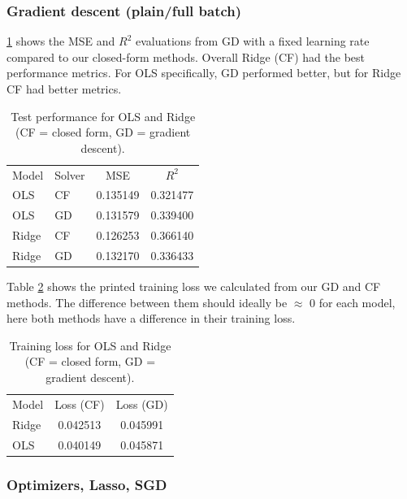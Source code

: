 \documentclass[amssymb,twocolumn,aps]{revtex4-2}
\begin{document}
\subsubsection{Gradient descent (plain/full batch)}

\ref{tab:test-ols-ridge} shows the MSE and $R^2$ evaluations from GD with a fixed learning rate compared to our closed-form methods. Overall Ridge (CF) had the best performance metrics. For OLS specifically, GD performed better, but for Ridge CF had better metrics. 

\begin{table}[h!]  %
\caption{Test performance for OLS and Ridge (CF = closed form, GD = gradient descent).}
\label{tab:test-ols-ridge}
\begin{ruledtabular}
\begin{tabular}{llcc} %
Model & Solver & MSE & $R^2$ \\
\colrule
OLS   & CF & 0.135149 & 0.321477 \\
OLS   & GD & 0.131579 & 0.339400 \\
Ridge & CF & 0.126253 & 0.366140 \\
Ridge & GD & 0.132170 & 0.336433 \\
\end{tabular}
\end{ruledtabular}
\end{table}

Table \ref{tab:train-ols-ridge} shows the printed training loss we calculated from our GD and CF methods. The difference between them should ideally be $\approx$ 0 for each model, here both methods have a difference in their training loss. 

\begin{table}[h!]
\caption{Training loss for OLS and Ridge (CF = closed form, GD = gradient descent).}
\label{tab:train-ols-ridge}
\begin{ruledtabular}
\begin{tabular}{lcc}
Model & Loss (CF) & Loss (GD) \\
\colrule
Ridge & 0.042513 & 0.045991 \\
OLS   & 0.040149 & 0.045871 \\
\end{tabular}
\end{ruledtabular}
\end{table}

\subsubsection{Optimizers, Lasso, SGD}
\end{document}
